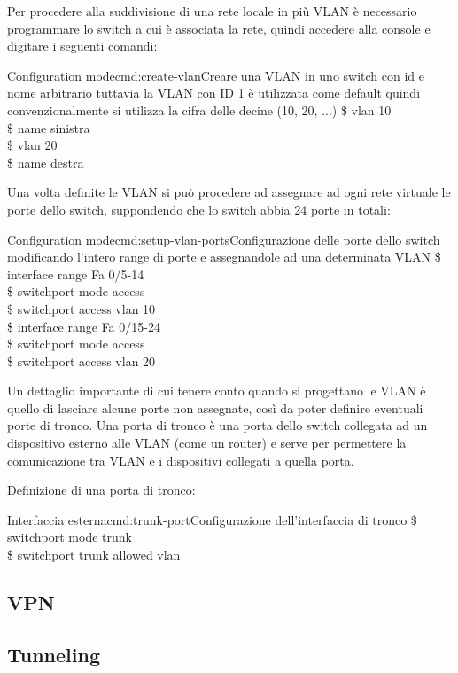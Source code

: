 Per procedere alla suddivisione di una rete locale in più VLAN è necessario programmare lo switch a cui è associata la rete, quindi accedere alla console e digitare i seguenti comandi:

\begin{cmds}[Switch]{Configuration mode}{cmd:create-vlan}{Creare una VLAN in uno switch con \textcolor{Highlight1}{id} e \textcolor{Highlight2}{nome} arbitrario tuttavia la VLAN con ID 1 è utilizzata come default quindi convenzionalmente si utilizza la cifra delle decine (10, 20, ...)}
    \$ vlan \textcolor{Highlight1}{10}\\
    \$ name \textcolor{Highlight2}{sinistra}\\
    \$ vlan \textcolor{Highlight1}{20}\\
    \$ name \textcolor{Highlight2}{destra}
\end{cmds}

Una volta definite le VLAN si può procedere ad assegnare ad ogni rete virtuale le porte dello switch, suppondendo che lo switch abbia 24 porte in totali:

\begin{cmds}{Configuration mode}{cmd:setup-vlan-ports}{Configurazione delle porte dello switch modificando l'intero \textcolor{Highlight1}{range} di porte e assegnandole ad una \textcolor{Highlight2}{determinata VLAN}}
    \$ interface range \textcolor{Highlight1}{Fa 0/5-14}\\
    \$ switchport mode access\\
    \$ switchport access \textcolor{Highlight2}{vlan 10}\\
    \$ interface range \textcolor{Highlight1}{Fa 0/15-24}\\
    \$ switchport mode access\\
    \$ switchport access \textcolor{Highlight2}{vlan 20}
\end{cmds}

Un dettaglio importante di cui tenere conto quando si progettano le VLAN è quello di lasciare alcune porte non assegnate, così da poter definire eventuali porte di tronco. Una porta di tronco è una porta dello switch collegata ad un dispositivo esterno alle VLAN (come un router) e serve per permettere la comunicazione tra VLAN e i dispositivi collegati a quella porta.

Definizione di una porta di tronco:

\begin{cmds}[Switch]{Interfaccia esterna}{cmd:trunk-port}{Configurazione dell'interfaccia di tronco}
    \$ switchport mode trunk\\
    \$ switchport trunk allowed vlan
\end{cmds}

\subsection{VPN}
\subsection{Tunneling}
